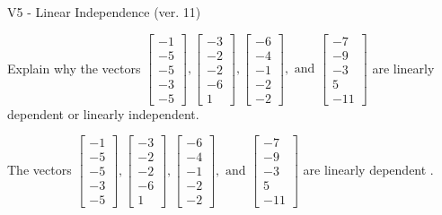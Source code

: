 \begin{exercise}
  \begin{exerciseTitle}V5 - Linear Independence (ver. 11)\end{exerciseTitle}
  \begin{exerciseStatement}
    Explain why the vectors \(\left[\begin{array}{r}
-1 \\
-5 \\
-5 \\
-3 \\
-5
\end{array}\right] , \left[\begin{array}{r}
-3 \\
-2 \\
-2 \\
-6 \\
1
\end{array}\right] , \left[\begin{array}{r}
-6 \\
-4 \\
-1 \\
-2 \\
-2
\end{array}\right] , \text{ and } \left[\begin{array}{r}
-7 \\
-9 \\
-3 \\
5 \\
-11
\end{array}\right]\) are linearly dependent or linearly independent.	


  \end{exerciseStatement}
  \begin{exerciseAnswer}
   The vectors \(\left[\begin{array}{r}
-1 \\
-5 \\
-5 \\
-3 \\
-5
\end{array}\right] , \left[\begin{array}{r}
-3 \\
-2 \\
-2 \\
-6 \\
1
\end{array}\right] , \left[\begin{array}{r}
-6 \\
-4 \\
-1 \\
-2 \\
-2
\end{array}\right] , \text{ and } \left[\begin{array}{r}
-7 \\
-9 \\
-3 \\
5 \\
-11
\end{array}\right]\) are 
  	 linearly dependent  .
  


  \end{exerciseAnswer}
\end{exercise}